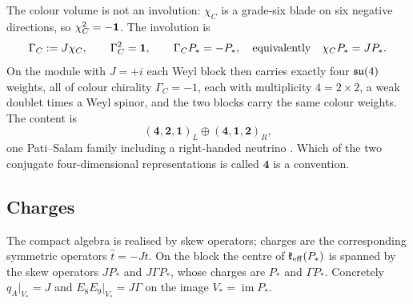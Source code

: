 \begin{corollary}
\label{cor:PSfamily}
The colour volume is not an involution: $\chi_C$ is a grade-six blade on six negative directions, so $\chi_C^2=-\mathbf 1$. The
involution is
\[
\Gamma_C:=J\chi_C,\qquad \Gamma_C^2=\mathbf 1,\qquad \Gamma_CP_*=-P_*,\quad\text{equivalently}\quad \chi_CP_*=JP_*.
\]
On the module with $J=+i$ each Weyl block then carries exactly four $\mathfrak{su}(4)$ weights, all of colour chirality $\Gamma_C=-1$, each with
multiplicity $4=2\times2$, a weak doublet times a Weyl spinor, and the two blocks carry the same colour weights. The content is
\[
(\mathbf4,\mathbf2,\mathbf1)_L\oplus(\mathbf4,\mathbf1,\mathbf2)_R ,
\]
one Pati--Salam family including a right-handed neutrino \cite{PatiSalam}. Which of the two conjugate four-dimensional representations
is called $\mathbf4$ is a convention.
\end{corollary}

\subsection{Charges}

The compact algebra is realised by skew operators; charges are the corresponding symmetric operators $\hat t=-Jt$. On the block the
centre of $\mathfrak k_{\rm eff}(P_*)$ is spanned by the skew operators $JP_*$ and $J\Gamma P_*$, whose charges are $P_*$ and $\Gamma P_*$. Concretely
$q_A|_{V_*}=J$ and $E_8E_9|_{V_*}=J\Gamma$ on the image $V_*=\operatorname{im}P_*$.

